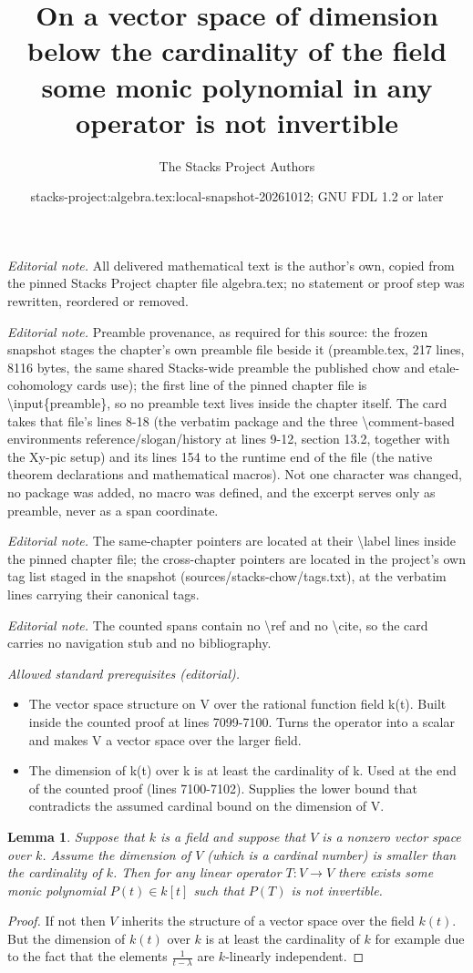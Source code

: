 \documentclass[10pt,a4paper]{amsart}
\title{On a vector space of dimension below the cardinality of the field some monic polynomial in any operator is not invertible}
\author{The Stacks Project Authors}
\date{stacks-project:algebra.tex:local-snapshot-20261012; GNU FDL 1.2 or later}
\theoremstyle{plain}
\newtheorem{lemma}[subsection]{Lemma}
\theoremstyle{definition}
\theoremstyle{remark}
\numberwithin{equation}{subsection}
\begin{document}
\maketitle
\noindent\textit{Editorial note.} All delivered mathematical text is the author's own, copied from the pinned Stacks Project chapter file algebra.tex; no statement or proof step was rewritten, reordered or removed.\par\medskip
\noindent\textit{Editorial note.} Preamble provenance, as required for this source: the frozen snapshot stages the chapter's own preamble file beside it (preamble.tex, 217 lines, 8116 bytes, the same shared Stacks-wide preamble the published chow and etale-cohomology cards use); the first line of the pinned chapter file is \textbackslash{}input\{preamble\}, so no preamble text lives inside the chapter itself. The card takes that file's lines 8-18 (the verbatim package and the three \textbackslash{}comment-based environments reference/slogan/history at lines 9-12, section 13.2, together with the Xy-pic setup) and its lines 154 to the runtime end of the file (the native theorem declarations and mathematical macros). Not one character was changed, no package was added, no macro was defined, and the excerpt serves only as preamble, never as a span coordinate.\par\medskip
\noindent\textit{Editorial note.} The same-chapter pointers are located at their \textbackslash{}label lines inside the pinned chapter file; the cross-chapter pointers are located in the project's own tag list staged in the snapshot (sources/stacks-chow/tags.txt), at the verbatim lines carrying their canonical tags.\par\medskip
\noindent\textit{Editorial note.} The counted spans contain no \textbackslash{}ref and no \textbackslash{}cite, so the card carries no navigation stub and no bibliography.\par\medskip
\noindent\textit{Allowed standard prerequisites (editorial).}\begin{itemize}
\item The vector space structure on V over the rational function field k(t). Built inside the counted proof at lines 7099-7100. Turns the operator into a scalar and makes V a vector space over the larger field.
\item The dimension of k(t) over k is at least the cardinality of k. Used at the end of the counted proof (lines 7100-7102). Supplies the lower bound that contradicts the assumed cardinal bound on the dimension of V.
\end{itemize}\medskip
\begin{lemma}
\label{lemma-dimension}
Suppose that $k$ is a field and suppose that $V$ is a nonzero vector
space over $k$. Assume the dimension of $V$ (which is a cardinal number)
is smaller than the cardinality of $k$. Then for any linear operator
$T : V \to V$ there exists some monic polynomial $P(t) \in k[t]$ such that
$P(T)$ is not invertible.
\end{lemma}

\begin{proof}
If not then $V$ inherits the structure of a vector space over
the field $k(t)$. But the dimension of $k(t)$ over $k$ is
at least the cardinality of $k$ for example due to the fact that the elements
$\frac{1}{t - \lambda}$ are $k$-linearly independent.
\end{proof}
\end{document}
